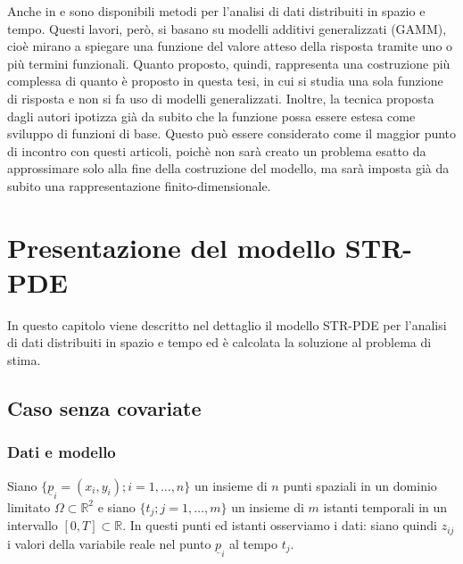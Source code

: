 \documentclass[a4paper,11pt,twoside,openright]{book}							%
\begin{document}
Anche in \cite{art:augustin} e \cite{art:marra} sono disponibili metodi per l'analisi di dati distribuiti in spazio e tempo. Questi lavori, però, si basano su modelli additivi generalizzati (GAMM), cioè mirano a spiegare una funzione del valore atteso della risposta tramite uno o più termini funzionali. Quanto proposto, quindi, rappresenta una costruzione più complessa di quanto è proposto in questa tesi, in cui si studia una sola funzione di risposta e non si fa uso di modelli generalizzati. Inoltre, la tecnica proposta dagli autori ipotizza già da subito che la funzione possa essere estesa come sviluppo di funzioni di base. Questo può essere considerato come il maggior punto di incontro con questi articoli, poichè non sarà creato un problema esatto da approssimare solo alla fine della costruzione del modello, ma sarà imposta già da subito una rappresentazione finito-dimensionale.


\chapter{Presentazione del modello STR-PDE}
\label{cap:modello}
In questo capitolo viene descritto nel dettaglio il modello STR-PDE per l'analisi di dati distribuiti in spazio e tempo ed è calcolata la soluzione al problema di stima.


\section{Caso senza covariate}

\subsection{Dati e modello}

Siano $\{\underline p_i = (x_i,y_i); i=1, \ldots , n\}$ un insieme di $n$ punti spaziali in un dominio limitato $\Omega \subset \mathbb R^2$ e siano $\{t_j ; j=1, \ldots , m\}$ un insieme di $m$ istanti temporali in un intervallo $[0,T]\subset \mathbb R$. In questi punti ed istanti osserviamo i dati: siano quindi $z_{ij}$ i valori della variabile reale nel punto $\underline p_i$ al tempo $t_j$.
\end{document}
